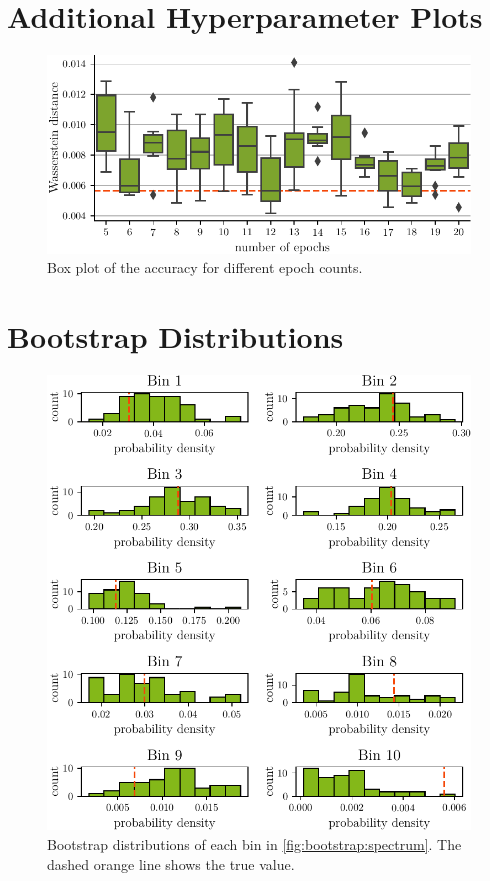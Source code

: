 \section{Additional Hyperparameter Plots}
\begin{figure}
  \centering
  \includegraphics[scale=1]{content/plots/hyperparam/num_epochs_vs_wd_boxplot_lessheight.pdf}
  \caption{Box plot of the accuracy for different epoch counts.}
  \label{fig:hyperparameter:num_epochs_vs_wd_boxplot}
\end{figure}


\clearpage
\section{Bootstrap Distributions}
\begin{figure}
  \centering
  \includegraphics[scale=1]{content/plots/bootstrap:distributions_doubleheight.pdf}
  \caption{
    Bootstrap distributions of each bin in \autoref{fig:bootstrap:spectrum}.
    The dashed orange line shows the true value.
  }
  \label{fig:bootstrap:distributions}
\end{figure}


